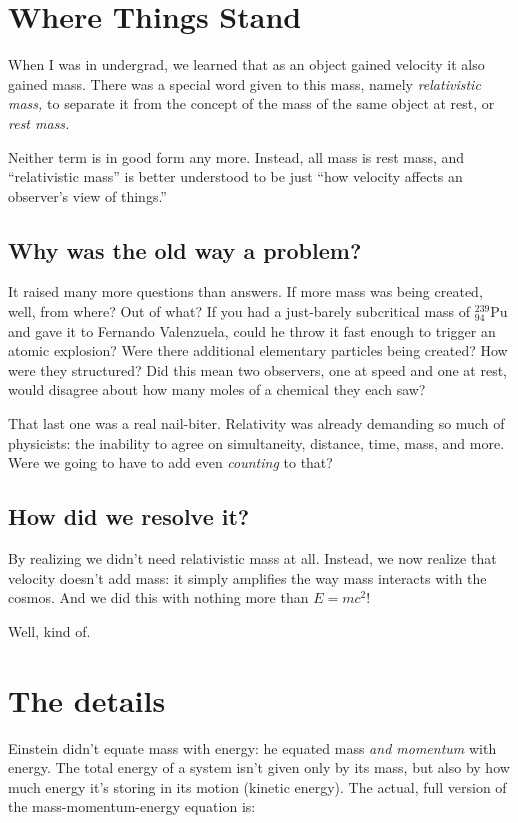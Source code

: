 \documentclass[10pt,letterpaper,oneside,notitlepage]{article}
\begin{document}
\section{Where Things Stand}
When I was in undergrad, we learned that as an object gained
velocity it also gained mass. There was a special word given to this mass,
namely \textit{relativistic mass,} to separate it from the concept of the
mass of the same object at rest, or \textit{rest mass.}

Neither term is in good form any more. Instead, all mass is rest mass,
and ``relativistic mass'' is better understood to be just ``how velocity
affects an observer's view of things.''

\subsection{Why was the old way a problem?}

It raised many more questions than answers. If more mass was being created,
well, from where? Out of what? If you had a just-barely subcritical mass
of $^{239}_{94}\text{Pu}$ and gave it to Fernando Valenzuela, could he throw it fast
enough to trigger an atomic explosion? Were there additional elementary
particles being created? How were they structured? Did this mean two
observers, one at speed and one at rest, would disagree about how many
moles of a chemical they each saw?

That last one was a real nail-biter. Relativity was already demanding so
much of physicists: the inability to agree on simultaneity, distance, time,
mass, and more. Were we going to have to add even \textit{counting} to that?

\subsection{How did we resolve it?}

By realizing we didn't need relativistic mass at all. Instead, we now
realize that velocity doesn't add mass: it simply amplifies the way
mass interacts with the cosmos. And we did this with nothing more than
$E = mc^{2}$!

Well, kind of.

\section{The details}

Einstein didn't equate mass with energy: he equated mass \textit{and
momentum} with energy. The total energy of a system isn't given only by
its mass, but also by how much energy it's storing in its motion
(kinetic energy). The actual, full version of the mass-momentum-energy
equation is:
\end{document}
